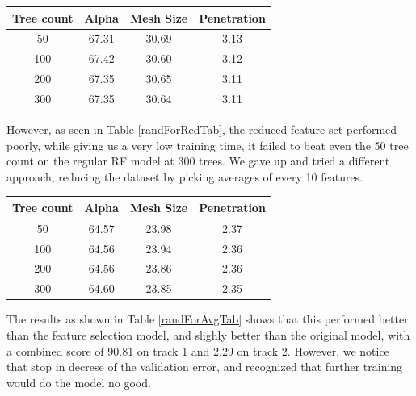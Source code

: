 \documentclass[a4paper, 12pt]{article}
\begin{document}
\begin{multicols}{2}
                
                \begin{center}
                    \begin{tabular}{c|ccc}
                        Tree count & Alpha & Mesh Size & Penetration\\
                        \hline
                        50 & 67.31 & 30.69 & 3.13 \\
                        100 & 67.42 & 30.60 & 3.12 \\
                        200 & 67.35 & 30.65 & 3.11 \\
                        300 & 67.35 & 30.64 & 3.11 \\
                    \end{tabular}
                    \label{randForRedTab}
                \end{center}

                However, as seen in Table \ref{randForRedTab}, the reduced feature set performed poorly, while giving us a very low training time, it failed to beat even the 50 tree count on the regular RF model at 300 trees. We gave up and tried a different approach, reducing the dataset by picking averages of every 10 features.

                
                \begin{center}
                    \begin{tabular}{c|ccc}
                        Tree count & Alpha & Mesh Size & Penetration\\
                        \hline
                        50 & 64.57 & 23.98 & 2.37 \\
                        100 & 64.56 & 23.94 & 2.36 \\
                        200 & 64.56 & 23.86 & 2.36 \\
                        300 & 64.60 & 23.85 & 2.35 \\
                    \end{tabular}
                    \label{randForAvgTab}
                \end{center}

                The results as shown in Table \ref{randForAvgTab} shows that this performed better than the feature selection model, and slighly better than the original model, with a combined score of 90.81 on track 1 and 2.29 on track 2. However, we notice that stop in decrese of the validation error, and recognized that further training would do the model no good.


\end{multicols}
\end{document}
